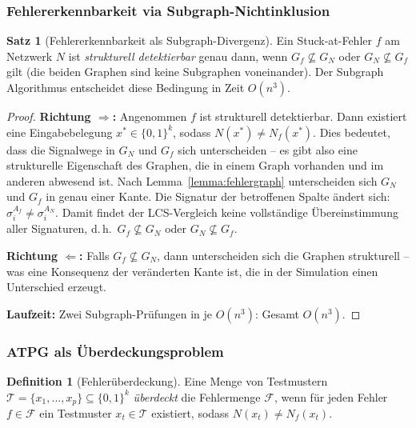 ﻿\documentclass[a4paper,12pt]{article}
\theoremstyle{definition}
\newtheorem{definition}{Definition}
\newtheorem{satz}{Satz}
\begin{document}
\subsubsection{Fehlererkennbarkeit via Subgraph-Nichtinklusion}

\begin{satz}[Fehlererkennbarkeit als Subgraph-Divergenz]\label{satz:fehlerdetekt}
  Ein Stuck-at-Fehler $f$ am Netzwerk $N$ ist \emph{strukturell detektierbar} genau
  dann, wenn $G_f \not\subseteq G_N$ oder $G_N \not\subseteq G_f$ gilt
  (die beiden Graphen sind keine Subgraphen voneinander). Der Subgraph Algorithmus
  entscheidet diese Bedingung in Zeit $O(n^3)$.
\end{satz}

\begin{proof}
  \textbf{Richtung $\Rightarrow$:} Angenommen $f$ ist strukturell detektierbar.
  Dann existiert eine Eingabebelegung $x^* \in \{0,1\}^k$, sodass $N(x^*) \neq N_f(x^*)$.
  Dies bedeutet, dass die Signalwege in $G_N$ und $G_f$ sich unterscheiden -- es gibt
  also eine strukturelle Eigenschaft des Graphen, die in einem Graph vorhanden und im
  anderen abwesend ist. Nach Lemma~\ref{lemma:fehlergraph} unterscheiden sich $G_N$
  und $G_f$ in genau einer Kante. Die Signatur der betroffenen Spalte ändert sich:
  $\sigma_i^{A_f} \neq \sigma_i^{A_N}$. Damit findet der LCS-Vergleich keine vollständige
  Übereinstimmung aller Signaturen, d.\,h.\ $G_f \not\subseteq G_N$ oder
  $G_N \not\subseteq G_f$.

  \textbf{Richtung $\Leftarrow$:} Falls $G_f \not\subseteq G_N$, dann unterscheiden
  sich die Graphen strukturell -- was eine Konsequenz der veränderten Kante ist, die
  in der Simulation einen Unterschied erzeugt.

  \textbf{Laufzeit:} Zwei Subgraph-Prüfungen in je $O(n^3)$: Gesamt $O(n^3)$.
\end{proof}

\subsubsection{ATPG als Überdeckungsproblem}

\begin{definition}[Fehlerüberdeckung]\label{def:fehlerueberdeckung}
  Eine Menge von Testmustern $\mathcal{T} = \{x_1, \ldots, x_p\} \subseteq \{0,1\}^k$
  \emph{überdeckt} die Fehlermenge $\mathcal{F}$, wenn für jeden Fehler
  $f \in \mathcal{F}$ ein Testmuster $x_t \in \mathcal{T}$ existiert, sodass
  $N(x_t) \neq N_f(x_t)$.
\end{definition}
\end{document}
